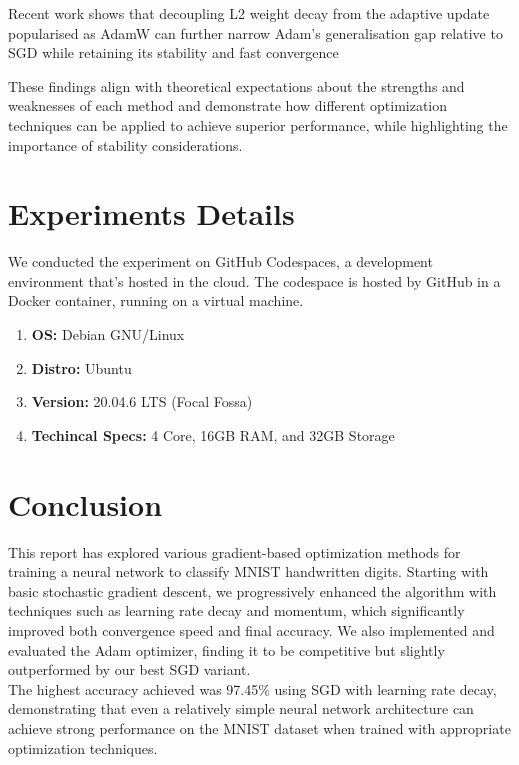 \documentclass{article}
\begin{document}
\noindent Recent work shows that decoupling L2 weight decay from the adaptive update popularised 
as AdamW can further narrow Adam's generalisation gap relative to SGD while retaining 
its stability and fast convergence \cite{loshchilov2019adamw}

These findings align with theoretical expectations about the strengths and weaknesses of each method \cite{wilson2017marginal, reddi2018convergence} and demonstrate how different optimization techniques can be applied to achieve superior performance, while highlighting the importance of stability considerations.

\section{Experiments Details}

\noindent We conducted the experiment on GitHub Codespaces, a development environment that's 
hosted in the cloud. The codespace is hosted by GitHub in a Docker container, running 
on a virtual machine.

\begin{enumerate}
    \item \textbf{OS:} Debian GNU/Linux
    \item \textbf{Distro:} Ubuntu
    \item \textbf{Version:} 20.04.6 LTS (Focal Fossa)
    \item \textbf{Techincal Specs:} 4 Core, 16GB RAM, and 32GB Storage
\end{enumerate}

\section{Conclusion}

This report has explored various gradient-based optimization methods for training a neural 
network to classify MNIST handwritten digits. Starting with basic stochastic gradient descent, 
we progressively enhanced the algorithm with techniques such as learning rate decay and 
momentum, which significantly improved both convergence speed and final accuracy. We also 
implemented and evaluated the Adam optimizer, finding it to be competitive but slightly 
outperformed by our best SGD variant. \\

The highest accuracy achieved was 97.45\% using SGD with learning rate decay, demonstrating 
that even a relatively simple neural network architecture can achieve strong performance on 
the MNIST dataset when trained with appropriate optimization techniques. \\
\end{document}
